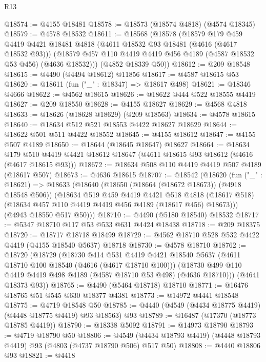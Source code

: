 \begin{lexlean}{R13}
\begin{coremodule}
@18574 := @4155 @18481
@18578 := @18573 (@18574 @4818) (@4574 @18345)
@18579 := @4578 @18532
@18611 := @18568
    (@18578
      (@18579
        @179
        @459
        @4419
        @4421
        @18481
        @4818
        (@4611 @18532 @93 @18481 (@4616 (@4617 @18532 @93)))
        (@18579 @457 @110 @4419 @4419 @456 @4189 (@4587 @18532 @53 @456) (@4636 @18532)))
      (@4852 @18339 @50))
@18612 := @209 @18548
@18615 := @4490 (@4494 @18612) @11856
@18617 := @4587 @18615 @53
@18620 := @18611 (fun ("_" : @18347) => @18617 @498)
@18621 := @18346 @4666
@18622 := @4562 @18615
@18626 := @18622 @444 @522 @18555 @4419
@18627 := @209 @18550
@18628 := @4155 @18627
@18629 := @4568 @4818
@18633 := @18626 (@18628 @18629) (@209 @18563)
@18634 := @4578 @18615
@18640 := @18634 @512 @521 @18553 @4422 @18627 @18629
@18644 := @18622 @501 @511 @4422 @18552
@18645 := @4155 @18612
@18647 := @4155 @507 @4189
@18650 := @18644 (@18645 @18647) @18627
@18664 := @18634
    @179
    @510
    @4419
    @4421
    @18612
    @18647
    (@4611 @18615 @93 @18612 (@4616 (@4617 @18615 @93)))
@18672 := @18634 @508 @110 @4419 @4419 @507 @4189 (@18617 @507)
@18673 := @4636 @18615
@18707 := @18542
    (@18620
      (fun ("_" : @18621) =>
      @18633
        (@18640
          (@18650 (@18664 (@18672 @18673)) (@4918 @18548 @506))
          (@18634
            @519
            @459
            @4419
            @4421
            @518
            @4818
            (@18617 @518)
            (@18634 @457 @110 @4419 @4419 @456 @4189 (@18617 @456) @18673)))
        (@4943 @18550 @517 @50)))
@18710 := @4490 (@5180 @18540) @18532
@18717 := @5347 @18710 @117 @53 @533 @631 @4424 @18438
@18718 := @209 @18375
@18720 := @18717 @18718 @18499
@18729 := @4562 @18710 @528 @532 @4422 @4419 (@4155 @18540 @5637) @18718
@18730 := @4578 @18710
@18762 := @18720
    (@18729
      (@18730
        @414
        @531
        @4419
        @4421
        @18540
        @5637
        (@4611 @18710 @100 @18540 (@4616 (@4617 @18710 @100)))
        (@18730 @499 @110 @4419 @4419 @498 @4189 (@4587 @18710 @53 @498) (@4636 @18710)))
      (@4641 @18373 @93))
@18765 := @4490 (@5464 @18718) @18710
@18771 := @16476 @18765 @51 @545 @630 @18377 @4381
@18773 := @14972 @4441 @18548
@18775 := @4719 @18548 @50
@18785 := @4440 (@4549 (@4434 @18775 @4419) (@4448 @18775 @4419) @93 @18563) @93
@18789 := @16487 (@17370 (@18773 @18785 @4419))
@18790 := @18338 @5092
@18791 := @14973 @18790
@18793 := @4719 @18790 @50
@18806 := @4549 (@4434 @18793 @4419) (@4448 @18793 @4419) @93 (@4803 (@4737 @18790 @506) @517 @50)
@18808 := @4440 @18806 @93
@18821 := @4418

\end{coremodule}
\end{lexlean}
